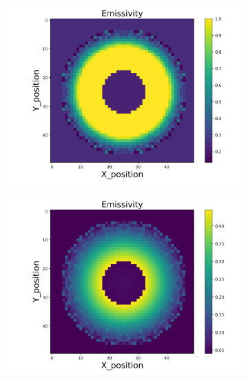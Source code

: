 \begin{figure}[p]
\begin{minipage}{\textwidth}
        \centering
        \begin{subfigure}{0.325\textwidth}
            \centering
            \includegraphics[width=\textwidth]{figures/raw_data/25/mix/emi_cal.jpg}
        \end{subfigure}
        \begin{subfigure}{0.325\textwidth}
            \centering
            \includegraphics[width=\textwidth]{figures/raw_data/26/mix/emi_cal.jpg}
        \end{subfigure}
        \begin{subfigure}{0.325\textwidth}
            \centering

\end{subfigure}
\end{minipage}
\end{figure}
